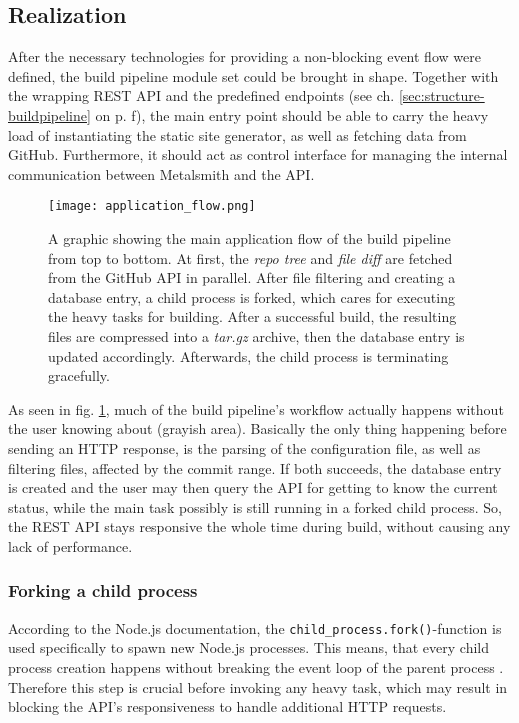 \subsection{Realization}
After the necessary technologies for providing a non-blocking event flow were defined, the build pipeline module set could be brought in shape. Together with the wrapping REST API and the predefined endpoints (see ch. \ref{sec:structure-buildpipeline} on p. \pageref{sec:structure-buildpipeline}f), the main entry point should be able to carry the heavy load of instantiating the static site generator, as well as fetching data from GitHub. Furthermore, it should act as control interface for managing the internal communication between Metalsmith and the API.

\begin{figure} %
    \centering
    \texttt{[image: application\_flow.png]}
    \caption{A graphic showing the main application flow of the build pipeline from top to bottom. At first, the \emph{repo tree} and \emph{file diff} are fetched from the GitHub API in parallel. After file filtering and creating a database entry, a child process is forked, which cares for executing the heavy tasks for building. After a successful build, the resulting files are compressed into a \emph{tar.gz} archive, then the database entry is updated accordingly. Afterwards, the child process is terminating gracefully.}
    \label{fig:application-flow}
\end{figure}
%

As seen in fig. \ref{fig:application-flow}, much of the build pipeline's workflow actually happens without the user knowing about (grayish area). Basically the only thing happening before sending an HTTP response, is the parsing of the configuration file, as well as filtering files, affected by the commit range. If both succeeds, the database entry is created and the user may then query the API for getting to know the current status, while the main task possibly is still running in a forked child process. So, the REST API stays responsive the whole time during build, without causing any lack of performance.

\subsubsection{Forking a child process}
According to the Node.js documentation, the \texttt{child\_process.fork()}-function is used specifically to spawn new Node.js processes. This means, that every child process creation happens without breaking the event loop of the parent process \cite{NodejsChildProcesses}. Therefore this step is crucial before invoking any heavy task, which may result in blocking the API's responsiveness to handle additional HTTP requests.

